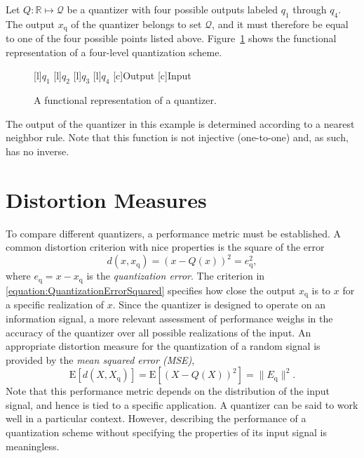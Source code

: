 \begin{example}
Let $Q : \mathbb{R} \mapsto \mathcal{Q}$ be a quantizer with four possible outputs labeled $q_1$ through $q_4$.
The output $x_{\mathrm{q}}$ of the quantizer belongs to set $\mathcal{Q}$, and it must therefore be equal to one of the four possible points listed above.
Figure~\ref{figure:Quantizer} shows the functional representation of a four-level quantization scheme.
\begin{figure}[htbp]
\begin{center}
\begin{psfrags}
[l]{$q_1$}
[l]{$q_2$}
[l]{$q_3$}
[l]{$q_4$}
[c]{Output}
[c]{Input}
\end{psfrags}
\caption{A functional representation of a quantizer.}
\label{figure:Quantizer}
\end{center}
\end{figure}

The output of the quantizer in this example is determined according to a nearest neighbor rule.
Note that this function is not injective (one-to-one) and, as such, has no inverse.
\end{example}


\section{Distortion Measures}

To compare different quantizers, a performance metric must be established.
A common distortion criterion with nice properties is the square of the error
\begin{equation} \label{equation:QuantizationErrorSquared}
d(x, x_{\mathrm{q}}) = (x - Q(x))^2 = e_{\mathrm{q}}^2 ,
\end{equation}
where $e_{\mathrm{q}} = x - x_{\mathrm{q}}$ is the \emph{quantization error}.
The criterion in \eqref{equation:QuantizationErrorSquared} specifies how close the output $x_{\mathrm{q}}$ is to $x$ for a specific realization of $x$.
Since the quantizer is designed to operate on an information signal, a more relevant assessment of performance weighs in the accuracy of the quantizer over all possible realizations of the input.
An appropriate distortion measure for the quantization of a random signal is provided by the \emph{mean squared error (MSE)},
\begin{equation} \label{equation:QuantizationMSE}
\mathrm{E} [ d(X, X_{\mathrm{q}}) ]
= \mathrm{E} \left[ (X - Q(X))^2 \right] = \| E_{\mathrm{q}} \|^2 .
\end{equation}
Note that this performance metric depends on the distribution of the input signal, and hence is tied to a specific application.
A quantizer can be said to work well in a particular context.
However, describing the performance of a quantization scheme without specifying the properties of its input signal is meaningless.

